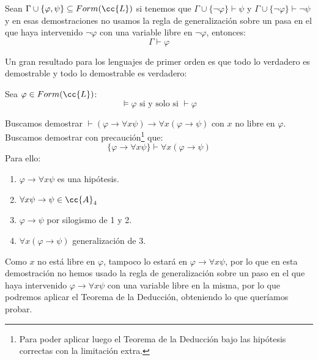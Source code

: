 \begin{teo}
    Sean $\Gamma\cup\{\varphi,\psi\}\subseteq Form(\cc{L})$ si tenemos que $\Gamma\cup\{\lnot\varphi\}\vdash \psi$ y $\Gamma\cup\{\lnot\varphi\}\vdash \lnot\psi$ y en esas demostraciones no usamos la regla de generalización sobre un pasa en el que haya intervenido $\lnot\varphi$ con una variable libre en $\lnot\varphi$, entonces:
    \begin{equation*}
        \Gamma\vdash \varphi
    \end{equation*}
\end{teo}

Un gran resultado para los lenguajes de primer orden es que todo lo verdadero es demostrable y todo lo demostrable es verdadero:
\begin{teo}
    Sea $\varphi \in Form(\cc{L})$:
    \begin{equation*}
        \vDash\varphi \text{\ si y solo si\ } \vdash \varphi
    \end{equation*}
\end{teo}


\begin{ejemplo}
    Buscamos demostrar $\vdash (\varphi \to \forall x\psi)\to \forall x(\varphi\to \psi)$ con $x$ no libre en $\varphi$.\\

        Buscamos demostrar con precaución\footnote{Para poder aplicar luego el Teorema de la Deducción bajo las hipótesis correctas con la limitación extra.} que:
        \begin{equation*}
            \{\varphi \to \forall x\psi\} \vdash \forall x(\varphi\to \psi)
        \end{equation*}
        Para ello:
        \begin{enumerate}
            \item $\varphi \to \forall x\psi$ es una hipótesis.
            \item $\forall x\psi\to \psi \in \cc{A}_4$
            \item $\varphi\to \psi$ por silogismo de 1 y 2.
            \item $\forall x(\varphi\to \psi)$ generalización de $3$.
        \end{enumerate}

        Como $x$ no está libre en $\varphi$, tampoco lo estará en $\varphi\to\forall x\psi$, por lo que en esta demostración no hemos usado la regla de generalización sobre un paso en el que haya intervenido $\varphi\to\forall x\psi$ con una variable libre en la misma, por lo que podremos aplicar el Teorema de la Deducción, obteniendo lo que queríamos probar.
\end{ejemplo}

